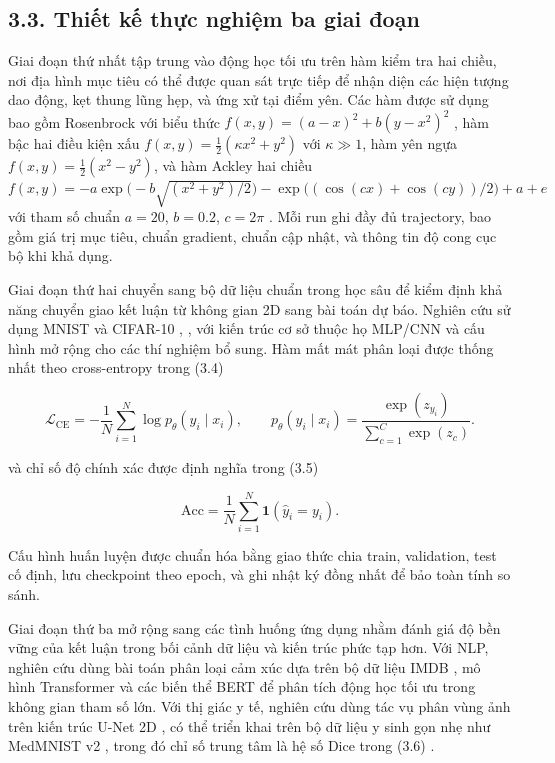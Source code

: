 \documentclass[a4paper,12pt]{article}
\begin{document}
\subsection{3.3. Thiết kế thực nghiệm ba giai đoạn}

Giai đoạn thứ nhất tập trung vào động học tối ưu trên hàm kiểm tra hai chiều, nơi địa hình mục tiêu có thể được quan sát trực tiếp để nhận diện các hiện tượng dao động, kẹt thung lũng hẹp, và ứng xử tại điểm yên. Các hàm được sử dụng bao gồm Rosenbrock với biểu thức $f(x,y)=(a-x)^2+b(y-x^2)^2$ \cite{ref6}, hàm bậc hai điều kiện xấu $f(x,y)=\tfrac{1}{2}(\kappa x^2+y^2)$ với $\kappa\gg1$, hàm yên ngựa $f(x,y)=\tfrac{1}{2}(x^2-y^2)$, và hàm Ackley hai chiều $f(x,y)=-a\exp\big(-b\sqrt{(x^2+y^2)/2}\big)-\exp\big((\cos(cx)+\cos(cy))/2\big)+a+e$ với tham số chuẩn $a=20$, $b=0.2$, $c=2\pi$ \cite{ref7}. Mỗi run ghi đầy đủ trajectory, bao gồm giá trị mục tiêu, chuẩn gradient, chuẩn cập nhật, và thông tin độ cong cục bộ khi khả dụng.

Giai đoạn thứ hai chuyển sang bộ dữ liệu chuẩn trong học sâu để kiểm định khả năng chuyển giao kết luận từ không gian 2D sang bài toán dự báo. Nghiên cứu sử dụng MNIST và CIFAR-10 \cite{ref8}, \cite{ref9}, với kiến trúc cơ sở thuộc họ MLP/CNN và cấu hình mở rộng cho các thí nghiệm bổ sung. Hàm mất mát phân loại được thống nhất theo cross-entropy trong (3.4)

\begin{equation}
\mathcal{L}_{\mathrm{CE}}=-\frac{1}{N}\sum_{i=1}^N\log p_\theta(y_i\mid x_i),
\qquad
p_\theta(y_i\mid x_i)=\frac{\exp(z_{y_i})}{\sum_{c=1}^{C}\exp(z_c)}.\tag{3.4}
\end{equation}

và chỉ số độ chính xác được định nghĩa trong (3.5)

\begin{equation}
\mathrm{Acc}=\frac{1}{N}\sum_{i=1}^{N}\mathbf{1}(\hat y_i=y_i).\tag{3.5}
\end{equation}

Cấu hình huấn luyện được chuẩn hóa bằng giao thức chia train, validation, test cố định, lưu checkpoint theo epoch, và ghi nhật ký đồng nhất để bảo toàn tính so sánh.

Giai đoạn thứ ba mở rộng sang các tình huống ứng dụng nhằm đánh giá độ bền vững của kết luận trong bối cảnh dữ liệu và kiến trúc phức tạp hơn. Với NLP, nghiên cứu dùng bài toán phân loại cảm xúc dựa trên bộ dữ liệu IMDB \cite{ref10}, mô hình Transformer \cite{ref12} và các biến thể BERT \cite{ref13} để phân tích động học tối ưu trong không gian tham số lớn. Với thị giác y tế, nghiên cứu dùng tác vụ phân vùng ảnh trên kiến trúc U-Net 2D \cite{ref14}, có thể triển khai trên bộ dữ liệu y sinh gọn nhẹ như MedMNIST v2 \cite{ref11}, trong đó chỉ số trung tâm là hệ số Dice trong (3.6) \cite{ref15}.
\end{document}
